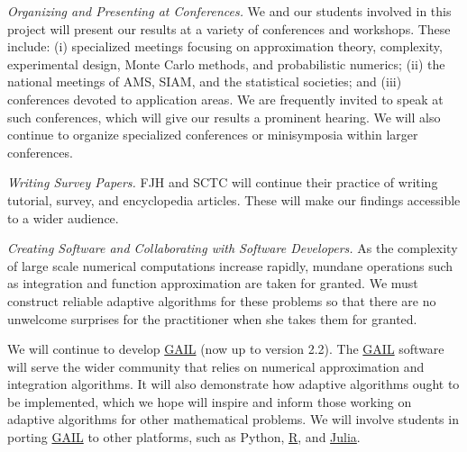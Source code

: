 \documentclass[11pt]{NSFamsart}
\newcommand{\GAIL}{\hyperlink{GAILlink}{GAIL}\xspace}
\newcommand{\Rlang}{\hyperlink{Rlink}{R}\xspace}
\newcommand{\Julia}{\hyperlink{Julialink}{Julia}\xspace}
\begin{document}
\emph{Organizing and Presenting at Conferences.}
We and our students involved in this project will present our results at a variety of conferences and workshops.  These include: (i) specialized meetings focusing on approximation theory, complexity, 
experimental design, Monte Carlo methods, and probabilistic numerics; (ii) the national meetings of AMS, SIAM, and the 
statistical societies; and (iii) conferences devoted to application areas.  We are frequently invited to 
speak at such conferences, which will give our results a prominent hearing. We will also continue to 
organize specialized conferences or minisymposia within larger conferences.

\emph{Writing Survey Papers.}
FJH and SCTC will continue their practice of writing tutorial, survey, and encyclopedia articles.  These will make our findings accessible to a wider audience.

\emph{Creating Software and Collaborating with Software Developers.}
As the complexity of large scale numerical computations increase rapidly, mundane operations such as integration and function approximation are taken for granted. We must construct reliable adaptive algorithms for these problems so that there are no unwelcome surprises for the practitioner when she takes them for granted.

We will continue to develop \GAIL \citep{ChoEtal17b} (now up to version 2.2).  The \GAIL software 
will serve the wider community that relies on numerical approximation and integration algorithms.  It will 
also demonstrate how adaptive algorithms ought to be implemented, which we hope will inspire and 
inform those working on adaptive algorithms for other mathematical problems.  We will involve 
students in porting \GAIL to other platforms, such as Python, \Rlang, and \Julia.  
\end{document}
